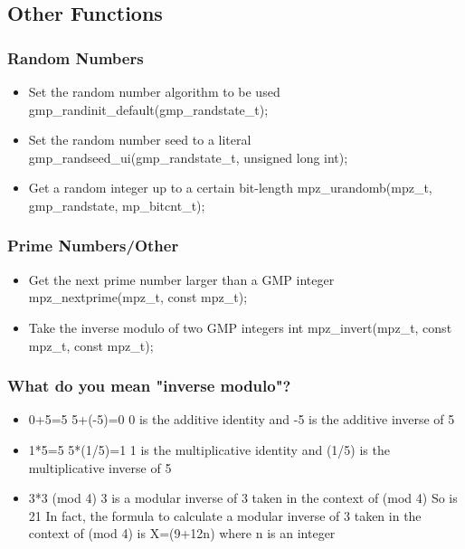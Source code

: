 \subsection{Other Functions}

\begin{frame}
\frametitle{Random Numbers}
\begin{itemize}
  \item Set the random number algorithm to be used
  gmp{\_}randinit{\_}default(gmp{\_}randstate{\_}t);
  \item Set the random number seed to a literal
  gmp{\_}randseed{\_}ui(gmp{\_}randstate{\_}t, unsigned long int);
  \item Get a random integer up to a certain bit-length
  mpz{\_}urandomb(mpz{\_}t, gmp{\_}randstate, mp{\_}bitcnt{\_}t);
\end{itemize}
\end{frame}

\begin{frame}
\frametitle{Prime Numbers/Other}
\begin{itemize}
  \item Get the next prime number larger than a GMP integer
  mpz{\_}nextprime(mpz{\_}t, const mpz{\_}t);
  \item Take the inverse modulo of two GMP integers
  int mpz{\_}invert(mpz{\_}t, const mpz{\_}t, const mpz{\_}t);
\end{itemize}
\end{frame}

\begin{frame}
\frametitle{What do you mean "inverse modulo"?}
\begin{itemize}
  \item 0+5=5 5+(-5)=0
  0 is the additive identity and -5 is the additive inverse of 5
  \item 1*5=5 5*(1/5)=1
  1 is the multiplicative identity and (1/5) is the multiplicative inverse of 5
  \item 3*3  (mod 4)
  3 is a modular inverse of 3 taken in the context of (mod 4)
  So is 21
  In fact, the formula to calculate a modular inverse of 3 taken
  in the context of (mod 4) is X=(9+12n) where n is an integer
\end{itemize}
\end{frame}
